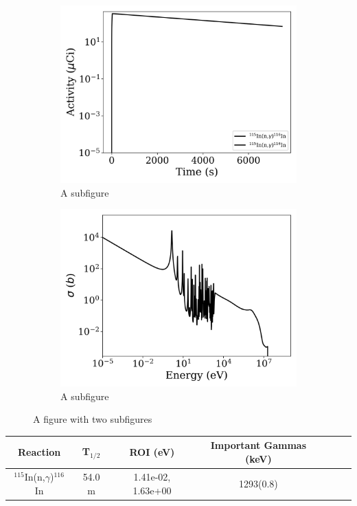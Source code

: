 \begin{figure}[h]
\centering
\begin{subfigure}{.5\textwidth}
  \centering
     \includegraphics[width=.8\textwidth]{plot/In-115(n,gamma)In-116_library1} 

  \caption{A subfigure}
  \label{fig:sub1}
\end{subfigure}%
\begin{subfigure}{.5\textwidth}
  \centering
     \includegraphics[width=.8\textwidth]{plot/In-115(n,gamma)In-116} 

  \caption{A subfigure}
  \label{fig:sub2}
\end{subfigure}
\caption{A figure with two subfigures}
\label{fig:test}
\end{figure}

\begin{table}[h]
\centering
\begin{tabular}{ |c|c|c|c|c|c|c| }
 \hline
 Reaction & T$_{1/2}$ & ROI (eV) & Important Gammas (keV) \\
 \hline 
 $^{115}$In(n,$\gamma$)$^{116}$In & 54.0 m & 1.41e-02, 1.63e+00 & 1293(0.8) \\ 
\hline
\end{tabular}
\end{table}
